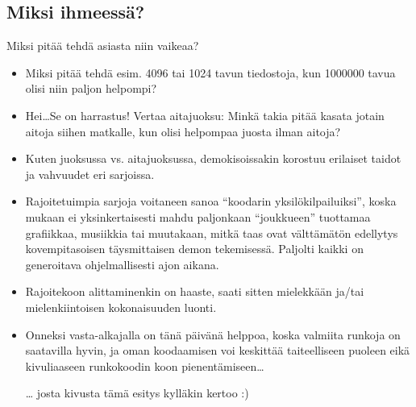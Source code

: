 \documentclass[pdf,10pt,handout]{beamer}
\begin{document}
\subsection{Miksi ihmeessä?}
\begin{frame}{Miksi pitää tehdä asiasta niin vaikeaa?}
  \begin{itemize}
  \item Miksi pitää tehdä esim. 4096 tai 1024 tavun tiedostoja, kun
    1000000 tavua olisi niin paljon helpompi?
  \item Hei\ldots Se on harrastus! Vertaa aitajuoksu: Minkä takia
    pitää kasata jotain aitoja siihen matkalle, kun olisi helpompaa
    juosta ilman aitoja?
  \item Kuten juoksussa vs. aitajuoksussa, demokisoissakin korostuu
    erilaiset taidot ja vahvuudet eri sarjoissa.
  \item Rajoitetuimpia sarjoja voitaneen sanoa ``koodarin
    yksilökilpailuiksi'', koska mukaan ei yksinkertaisesti mahdu
    paljonkaan ``joukkueen'' tuottamaa grafiikkaa, musiikkia tai
    muutakaan, mitkä taas ovat välttämätön edellytys kovempitasoisen
    täysmittaisen demon tekemisessä.  Paljolti kaikki on generoitava
    ohjelmallisesti ajon aikana.
  \item Rajoitekoon alittaminenkin on haaste, saati sitten mielekkään
    ja/tai mielenkiintoisen kokonaisuuden luonti.
  \item Onneksi vasta-alkajalla on tänä päivänä helppoa, koska
    valmiita runkoja on saatavilla hyvin, ja oman koodaamisen voi
    keskittää taiteelliseen puoleen eikä kivuliaaseen runkokoodin koon
    pienentämiseen\ldots
  \item[\ldots] josta kivusta tämä esitys kylläkin kertoo :)
  \end{itemize}
\end{frame}
\end{document}
